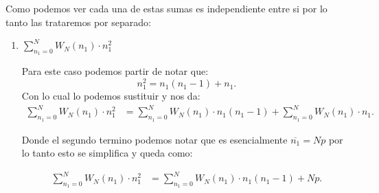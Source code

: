 \documentclass{report}
\begin{document}
Como podemos ver cada una de estas sumas es independiente entre si por lo tanto las trataremos por separado:
\begin{enumerate}
  \item $\displaystyle\sum_{n_1 = 0}^{N} W_N\left( n_1 \right) \cdot n_1^2$

    Para este caso podemos partir de notar que: \[
      n_1^2 = n_1\left( n_1 - 1 \right) + n_1
    .\] Con lo cual lo podemos sustituir y nos da:
    \begin{align*}
      \sum_{n_1 = 0}^{N} W_N\left( n_1 \right) \cdot n_1^2 &= \sum_{n_1 = 0}^{N} W_N\left( n_1 \right) \cdot n_1\left( n_1 - 1\right) + \sum_{n_1 = 0}^{N} W_N\left( n_1 \right) \cdot n_1
    .\end{align*}

    Donde el segundo termino podemos notar que es esencialmente $\overline{n_1} = Np$ por lo tanto esto se simplifica y queda como:

    \begin{align*}
      \sum_{n_1 = 0}^{N} W_N\left( n_1 \right) \cdot n_1^2 &= \sum_{n_1 = 0}^{N} W_N\left( n_1 \right) \cdot n_1\left( n_1 - 1\right) + Np
    .\end{align*}


\end{enumerate}
\end{document}
